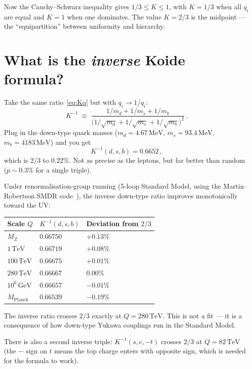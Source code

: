\documentclass[11pt,a4paper]{article}
\newcommand{\MeV}{\,\mathrm{MeV}}
\newcommand{\GeV}{\,\mathrm{GeV}}
\newcommand{\TeV}{\,\mathrm{TeV}}
\begin{document}
Now the Cauchy--Schwarz inequality gives $1/3 \leq K \leq 1$,
with $K = 1/3$ when all $q_i$ are equal and $K = 1$ when
one dominates.
The value $K = 2/3$ is the midpoint --- the ``equipartition''
between uniformity and hierarchy.


\section{What is the \emph{inverse} Koide formula?}

Take the same ratio~\eqref{eq:Kq} but with $q_i \to 1/q_i$:
\begin{equation}
  K^{-1} \;\equiv\;
  \frac{1/m_d + 1/m_s + 1/m_b}
  {\bigl(1/\sqrt{m_d} + 1/\sqrt{m_s} + 1/\sqrt{m_b}\bigr)^2}\,.
  \label{eq:Kinv}
\end{equation}
Plug in the down-type quark masses ($m_d = 4.67\MeV$,
$m_s = 93.4\MeV$, $m_b = 4183\MeV$) and you get
\begin{equation}
  K^{-1}(d,s,b) = 0.6652\,,
\end{equation}
which is $2/3$ to $0.22\%$.
Not as precise as the leptons, but far better than random
($p \sim 0.3\%$ for a single triple).

Under renormalisation-group running (5-loop Standard Model,
using the Martin--Robertson SMDR code~\cite{MartinRobertson:2019}),
the inverse down-type ratio improves monotonically toward the UV:

\begin{center}
\begin{tabular}{lll}
\toprule
Scale $Q$ & $K^{-1}(d,s,b)$ & Deviation from $2/3$ \\
\midrule
$M_Z$        & $0.66750$ & $+0.13\%$ \\
$1\TeV$      & $0.66719$ & $+0.08\%$ \\
$100\TeV$    & $0.66675$ & $+0.01\%$ \\
$280\TeV$    & $\mathbf{0.66667}$ & $\mathbf{0.00\%}$ \\
$10^6\GeV$   & $0.66657$ & $-0.01\%$ \\
$M_\text{Planck}$ & $0.66539$ & $-0.19\%$ \\
\bottomrule
\end{tabular}
\end{center}
The inverse ratio crosses $2/3$ exactly at $Q = 280\TeV$.
This is not a fit --- it is a consequence of how down-type
Yukawa couplings run in the Standard Model.

There is also a second inverse triple: $K^{-1}(s,c,-t)$
crosses $2/3$ at $Q = 82\TeV$ (the $-$ sign on $t$ means the
top charge enters with opposite sign, which is needed for
the formula to work).
\end{document}
